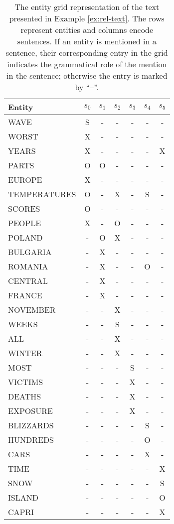 \begin{table}[!ht]	
	\begin{center}
		\begin{tabular}{lcccccc}
			\toprule
			Entity  		& $s_0$ & $s_1$ & $s_2$ & $s_3$ & $s_4$ & $s_5$ 
			\\
			\midrule
			WAVE 			& S & - & - & - & - & - \\
			WORST 			& X & - & - & - & - & - \\
			YEARS 			& X & - & - & - & - & X \\
			PARTS 			& O & O & - & - & - & - \\
			EUROPE  		& X & - & - & - & - & - \\
			TEMPERATURES  	& O & - & X & - & S & - \\
			SCORES  		& O & - & - & - & - & - \\
			PEOPLE  		& X & - & O & - & - & - \\
			POLAND 			& - & O & X & - & - & - \\
			BULGARIA  		& - & X & - & - & - & - \\
			ROMANIA  		& - & X & - & - & O & - \\
			CENTRAL  		& - & X & - & - & - & - \\
			FRANCE  		& - & X & - & - & - & - \\
			NOVEMBER  		& - & - & X & - & - & - \\
			WEEKS 			& - & - & S & - & - & - \\
			ALL 			& - & - & X & - & - & - \\
			WINTER  		& - & - & X & - & - & - \\
			MOST 			& - & - & - & S & - & - \\
			VICTIMS  		& - & - & - & X & - & - \\
			DEATHS 			& - & - & - & X & - & - \\
			EXPOSURE  		& - & - & - & X & - & - \\
			BLIZZARDS  		& - & - & - & - & S & - \\
			HUNDREDS  		& - & - & - & - & O & - \\
			CARS  			& - & - & - & - & X & - \\
			TIME  			& - & - & - & - & - & X \\
			SNOW  			& - & - & - & - & - & S \\
			ISLAND 			& - & - & - & - & - & O \\
			CAPRI 			& - & - & - & - & - & X \\
			\bottomrule
		\end{tabular}
		\caption{
		The entity grid representation of the text presented in Example \ref{ex:rel-text}. The rows represent entities and columns encode sentences. 
        If an entity is mentioned in a sentence, their corresponding entry in the grid indicates the grammatical role of the mention in the sentence; otherwise the entry is marked by ``--''.
		} 
		\label{tab:rel-egrid}
	\end{center}
\end{table}

